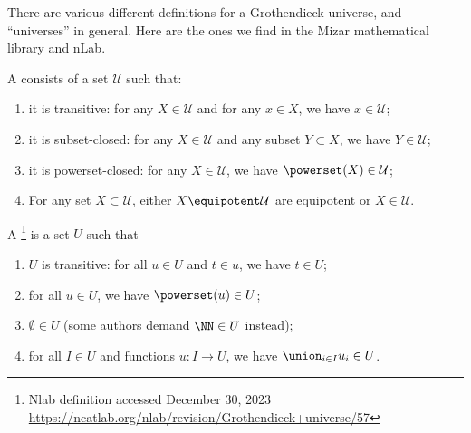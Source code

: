 \begin{node}\label{tg-0001}%
There are various different definitions for a Grothendieck universe, and
``universes'' in general. Here are the ones we find in the Mizar
mathematical library and nLab.

\begin{definition}\label{set:tg-000E}%
A  consists of a set $\mathcal{U}$ such that:
\begin{enumerate}
\item it is transitive: for any $X\in\mathcal{U}$ and for any $x\in X$,
  we have $x\in\mathcal{U}$;
\item it is subset-closed: for any $X\in\mathcal{U}$ and any subset
  $Y\subset X$, we have $Y\in\mathcal{U}$;
\item it is powerset-closed: for any $X\in\mathcal{U}$, we have $\powerset(X)\in\mathcal{U}$;
\item For any set $X\subset\mathcal{U}$, either
  $X\equipotent\mathcal{U}$ are equipotent or $X\in\mathcal{U}$.
\end{enumerate}
\end{definition}

\begin{definition}\label{set:tg-0000}%
A \footnote{Nlab definition accessed
December 30, 2023 \url{https://ncatlab.org/nlab/revision/Grothendieck+universe/57}} is a set $U$ such that
\begin{enumerate}
\item $U$ is transitive: for all $u\in U$ and $t\in u$, we have $t\in U$;
\item for all $u\in U$, we have $\powerset(u)\in U$;
\item $\emptyset\in U$ (some authors demand $\NN\in U$ instead);
\item for all $I\in U$ and functions $u\colon I\to U$, we have
  $\union_{i\in I}u_{i}\in U$.
\end{enumerate}
\end{definition}


\end{node}
